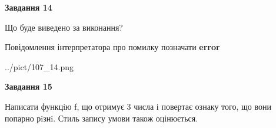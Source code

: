 \documentclass[11pt, ukrainian]{article}
\begin{document}
{\begin {large}
{\begin {center}\textbf{Завдання 14}\end {center}}\par
Що буде виведено за виконання? \par
Повідомлення інтерпретатора про помилку позначати \textbf{error}

\begin{center}
	{../pict/107_14.png}
\end{center}
\newpage

{\begin {center}\textbf{Завдання 15}\end {center}}\par

Написати функцiю f, що отримує 3 числа і повертає ознаку того, що вони попарно рiзнi. Стиль запису умови також оцінюється.\par
\newpage

\end {large}}
\end{document}
